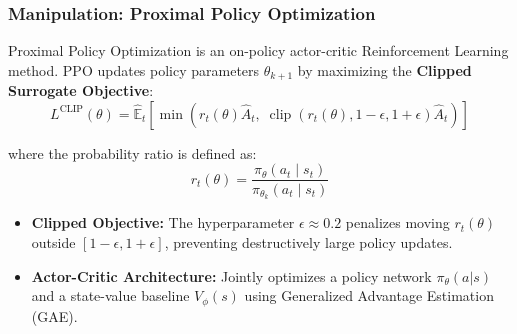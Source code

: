 \documentclass[10pt]{beamer}
\begin{document}
\begin{frame}
    \frametitle{Manipulation: Proximal Policy Optimization}
    Proximal Policy Optimization is an on-policy actor-critic Reinforcement Learning method. PPO updates policy parameters $\theta_{k+1}$ by maximizing the \textbf{Clipped Surrogate Objective}:
    \[
    L^{\text{CLIP}}(\theta) = \hat{\mathbb{E}}_t \left[ \min \left( r_t(\theta)\hat{A}_t, \; \operatorname{clip}(r_t(\theta), 1-\epsilon, 1+\epsilon)\hat{A}_t \right) \right]
    \]
    
    where the probability ratio is defined as:
    \[
    r_t(\theta) = \frac{\pi_\theta(a_t \mid s_t)}{\pi_{\theta_k}(a_t \mid s_t)}
    \]

    \begin{itemize}
        \item \textbf{Clipped Objective:} The hyperparameter $\epsilon \approx 0.2$ penalizes moving $r_t(\theta)$ outside $[1-\epsilon, 1+\epsilon]$, preventing destructively large policy updates.
        \item \textbf{Actor-Critic Architecture:} Jointly optimizes a policy network $\pi_\theta(a|s)$ and a state-value baseline $V_\phi(s)$ using Generalized Advantage Estimation (GAE).
    \end{itemize}
\end{frame}
\end{document}

